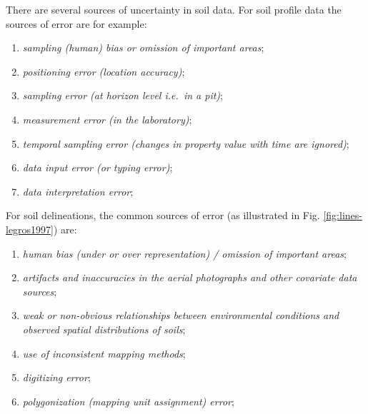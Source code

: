 \documentclass[graybox,natbib,nospthms,UStrade]{svmono}
\begin{document}
There are several sources of uncertainty in soil data. For soil profile
data the sources of error are for example:

\begin{enumerate}
\def\labelenumi{\arabic{enumi}.}
\item
  \emph{sampling (human) bias or omission of important areas};
\item
  \emph{positioning error (location accuracy)};
\item
  \emph{sampling error (at horizon level i.e.~in a pit)};
\item
  \emph{measurement error (in the laboratory)};
\item
  \emph{temporal sampling error (changes in property value with time
  are ignored)};
\item
  \emph{data input error (or typing error)};
\item
  \emph{data interpretation error};
\end{enumerate}

For soil delineations, the common sources of error (as illustrated in
Fig. \ref{fig:lines-legros1997}) are:

\begin{enumerate}
\def\labelenumi{\arabic{enumi}.}
\item
  \emph{human bias (under or over representation) / omission of important
  areas};
\item
  \emph{artifacts and inaccuracies in the aerial photographs and other
  covariate data sources};
\item
  \emph{weak or non-obvious relationships between environmental conditions
  and observed spatial distributions of soils};
\item
  \emph{use of inconsistent mapping methods};
\item
  \emph{digitizing error};
\item
  \emph{polygonization (mapping unit assignment) error};
\end{enumerate}
\end{document}
